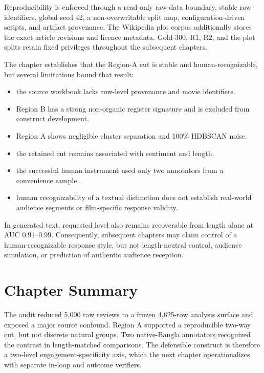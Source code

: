 Reproducibility is enforced through a read-only raw-data boundary, stable row identifiers, global seed 42, a non-overwritable split map, configuration-driven scripts, and artifact provenance. The Wikipedia plot corpus additionally stores the exact article revisions and licence metadata. Gold-300, R1, R2, and the plot splits retain fixed privileges throughout the subsequent chapters.

The chapter establishes that the Region-A cut is stable and human-recognizable, but several limitations bound that result:

\begin{itemize}
\item the source workbook lacks row-level provenance and movie identifiers.
\item Region B has a strong non-organic register signature and is excluded from
construct development.
\item Region A shows negligible cluster separation and 100\% HDBSCAN noise.
\item the retained cut remains associated with sentiment and length.
\item the successful human instrument used only two annotators from a convenience
sample.
\item human recognizability of a textual distinction does not establish real-world
audience segments or film-specific response validity.
\end{itemize}

In generated text, requested level also remains recoverable from length alone at AUC 0.91--0.99. Consequently, subsequent chapters may claim control of a human-recognizable response style, but not length-neutral control, audience simulation, or prediction of authentic audience reception.

\section{Chapter Summary}
\label{sec:ch3-summary}

The audit reduced 5,000 raw reviews to a frozen 4,625-row analysis surface and exposed a major source confound. Region A supported a reproducible two-way cut, but not discrete natural groups. Two native-Bangla annotators recognized the contrast in length-matched comparisons. The defensible construct is therefore a two-level engagement-specificity axis, which the next chapter operationalizes with separate in-loop and outcome verifiers.
